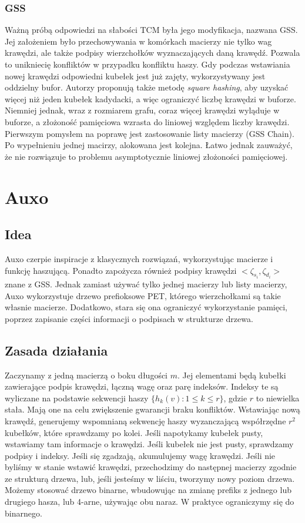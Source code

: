 \documentclass{article}
\theoremstyle{definition}
\begin{document}
        \subsubsection{GSS}
            Ważną próbą odpowiedzi na słabości TCM była jego modyfikacja, nazwana GSS. Jej założeniem było przechowywania w komórkach macierzy nie tylko wag krawędzi, ale także podpisy wierzchołków wyznaczających daną krawędź. Pozwala to unikniecię konfliktów w przypadku konfliktu haszy. Gdy podczas wstawiania nowej krawędzi odpowiedni kubełek jest już zajęty, wykorzystywany jest oddzielny bufor. Autorzy proponują także metodę \textit{square hashing}, aby uzyskać więcej niż jeden kubełek kadydacki, a więc ograniczyć liczbę krawędzi w buforze. Niemniej jednak, wraz z rozmiarem grafu, coraz więcej krawędzi wyląduje w buforze, a złożoność pamięciowa wzrasta do liniowej względem liczby krawędzi. Pierwszym pomysłem na poprawę jest zastosowanie listy macierzy (GSS Chain). Po wypełnieniu jednej macirzy, alokowana jest kolejna. Łatwo jednak zauważyć, że nie rozwiązuje to problemu asymptotycznie liniowej złożoności pamięciowej.
            
    \section{Auxo}
    
    \subsection{Idea}
        Auxo czerpie inspiracje z klasycznych rozwiązań, wykorzystując macierze i funkcję haszującą. Ponadto zapożycza również podpisy krawędzi $<\zeta_{s_i},\zeta_{d_i}>$ znane z GSS. Jednak zamiast używać tylko jednej macierzy lub listy macierzy, Auxo wykorzystuje drzewo prefioksowe PET, którego wierzchołkami są takie własnie macierze. Dodatkowo, stara się ona ograniczyć wykorzystanie pamięci, poprzez zapisanie części informacji o podpisach w strukturze drzewa. 
    
    \subsection{Zasada działania}
        Zaczynamy z jedną macierzą o boku długości $m$. Jej elementami będą kubełki zawierające podpis krawędzi, łączną wagę oraz parę indeksów. Indeksy te są wyliczane na podstawie sekwencji haszy $\{h_k(v): 1 \leq k \leq r\}$, gdzie $r$ to niewielka stała. Mają one na celu zwiększenie gwarancji braku konfliktów. Wstawiając nową krawędź, generujemy wspomnianą sekwencję haszy wyzanczającą współrzędne $r^2$ kubełków, które sprawdzamy po kolei. Jeśli napotykamy kubełek pusty, wstawiamy tam informacje o krawędzi. Jeśli kubełek nie jest pusty, sprawdzamy podpisy i indeksy. Jeśli się zgadzają, akumulujemy wagę krawędzi. Jeśli nie byliśmy w stanie wstawić krawędzi, przechodzimy do następnej macierzy zgodnie ze strukturą drzewa, lub, jeśli jesteśmy w liściu, tworzymy nowy poziom drzewa. Możemy stosować drzewo binarne, wbudowując na zmianę prefiks z jednego lub drugiego hasza, lub 4-arne, używając obu naraz. W praktyce ograniczymy się do binarnego.
\end{document}
